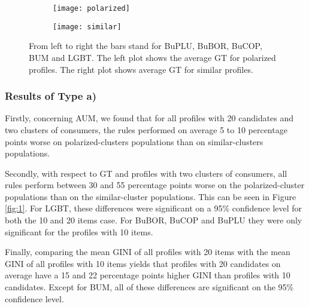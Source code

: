 \documentclass{article}
\begin{document}
\begin{figure}[h]
\centering
\label{fig:1}
\begin{subfigure}%
  \centering
  \texttt{[image: polarized]}
    \vspace{-1.8ex}
  \label{fig:sub1}
\end{subfigure}%
\begin{subfigure}%
  \centering
  \texttt{[image: similar]}
  \vspace{-2ex}
  \label{fig:sub2}
  \end{subfigure}
  \caption{From left to right the bars stand for BuPLU, BuBOR, BuCOP, BUM and LGBT. The left plot shows the average GT for polarized profiles. The right plot shows average GT for similar profiles.}
\end{figure}


\subsubsection{Results of Type a)}

Firstly, concerning AUM, we found that for all profiles with 20 candidates and two clusters of consumers, the rules performed on average 5 to 10 percentage points worse on polarized-clusters populations than on similar-clusters populations.

Secondly, with respect to GT and profiles with two clusters of consumers, all rules perform between 30 and 55 percentage points worse on the polarized-cluster populations than on the similar-cluster populations. This can be seen in Figure \ref{fig:1}.
For LGBT, these differences were significant on a 95\% confidence level for both the 10 and 20 items case. For BuBOR, BuCOP and BuPLU they were only significant for the profiles with 10 items.



Finally, comparing the mean GINI of all profiles with 20 items with the mean GINI of all profiles with 10 items yields that profiles with 20 candidates on average have a 15 and 22 percentage points higher GINI than profiles with 10 candidates.
Except for BUM, all of these differences are significant on the 95\% confidence level.
\end{document}
